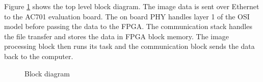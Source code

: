 Figure \ref{fig:blockdiagram} shows the top level block diagram. The image data
is sent over Ethernet to the AC701 evaluation board. The on board PHY handles
layer 1 of the OSI model before passing the data to the FPGA. The communication
stack handles the file transfer and stores the data in FPGA block memory. The
image processing block then runs its task and the communication block sends the
data back to the computer.

\begin{figure}[h!]
    \centering
    
    \caption{Block diagram}
    \label{fig:blockdiagram}
\end{figure}



